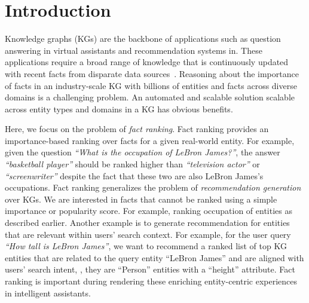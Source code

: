 \section{Introduction}\label{sec:intro}

Knowledge graphs (KGs) are the backbone of applications such as question answering in virtual assistants and recommendation systems in. These applications require a broad range of knowledge that is continuously updated with recent facts from disparate data sources~\cite{apple_kp, industry_kgs}. Reasoning about the importance of facts in an industry-scale KG with billions of entities and facts across diverse domains is a challenging problem. An automated and scalable solution scalable across entity types and domains in a KG has obvious benefits.

Here, we focus on the problem of \emph{fact ranking}. Fact ranking provides an importance-based ranking over facts for a given real-world entity. For example, given the question \emph{``What is the occupation of LeBron James?''}, the answer \emph{``basketball player''} should be ranked higher than \emph{``television actor''} or \emph{``screenwriter''} despite the fact that these two are also LeBron James's occupations. Fact ranking generalizes the problem of \emph{recommendation generation}~\cite{bouraga2014knowledge} over KGs. We are interested in facts that cannot be ranked using a simple importance or popularity score. For example, ranking occupation of entities as described earlier. Another example is to generate recommendation for entities that are relevant within users' search context. For example, for the user query \emph{``How tall is LeBron James''}, we want to recommend a ranked list of top KG entities that are related to the query entity ``LeBron James'' and are aligned with users' search intent, \ie, they are ``Person'' entities with a ``height'' attribute. Fact ranking is important during rendering these enriching entity-centric experiences in intelligent assistants. 



